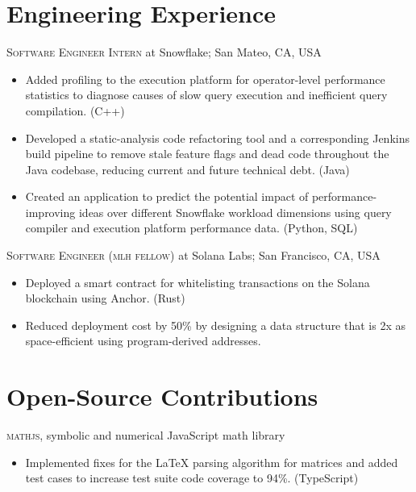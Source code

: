 \documentclass[11pt]{article} %
\begin{document}

\section*{Engineering Experience}

\textsc{Software Engineer Intern} at Snowflake; San Mateo, CA, USA

\begin{itemize}
	\item Added profiling to the execution platform for operator-level performance statistics to diagnose causes of slow query execution and inefficient query compilation. (C++)
	\item Developed a static-analysis code refactoring tool and a corresponding Jenkins build pipeline to remove stale feature flags and dead code throughout the Java codebase, reducing current and future technical debt. (Java)
  \item Created an application to predict the potential impact of performance-improving ideas over different Snowflake workload dimensions using query compiler and execution platform performance data. (Python, SQL)
\end{itemize}

\textsc{Software Engineer (mlh fellow)} at Solana Labs; San Francisco, CA, USA
\begin{itemize}
	\item Deployed a smart contract for whitelisting transactions on the Solana blockchain using Anchor. (Rust)
  \item Reduced deployment cost by 50\% by designing a data structure that is 2x as space-efficient using program-derived addresses.
\end{itemize}

\section*{Open-Source Contributions}

\textsc{mathjs}, symbolic and numerical JavaScript math library
\begin{itemize}
	\item Implemented fixes for the LaTeX parsing algorithm for matrices and added test cases to increase test suite code coverage to 94\%. (TypeScript)
\end{itemize}
\end{document}
